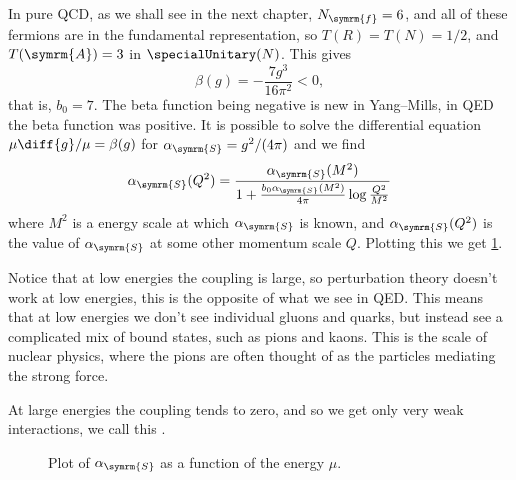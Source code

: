 \documentclass[fleqn]{NotesClass}
\newcommand{\strongCoupling}{\alpha_{\symrm{S}}}
\newcommand{\adjointRep}{\symrm{A}}
\newcommand{\numberFermions}{N_{\symrm{f}}}
\begin{document}
    In pure QCD, as we shall see in the next chapter, \(\numberFermions = 6\), and all of these fermions are in the fundamental representation, so \(T(R) = T(N) = 1/2\), and \(T(\adjointRep) = 3\) in \(\specialUnitary(N)\).
    This gives
    \begin{equation}
        \beta(g) = -\frac{7g^3}{16\pi^2} < 0,
    \end{equation}
    that is, \(b_0 = 7\).
    The beta function being negative is new in Yang--Mills, in QED the beta function was positive.
    It is possible to solve the differential equation \(\mu\diff{g}/{\mu} = \beta(g)\) for \(\strongCoupling = g^2/(4\pi)\) and we find
    \begin{equation}
        \strongCoupling(Q^2) = \frac{\strongCoupling(M^2)}{1 + \frac{b_0\strongCoupling(M^2)}{4\pi}\log\frac{Q^2}{M^2}}
    \end{equation}
    where \(M^2\) is a energy scale at which \(\strongCoupling\) is known, and \(\strongCoupling(Q^2)\) is the value of \(\strongCoupling\) at some other momentum scale \(Q\).
    Plotting this we get \cref{fig:YM beta plot}.
    
    Notice that at low energies the coupling is large, so perturbation theory doesn't work at low energies, this is the opposite of what we see in QED.
    This means that at low energies we don't see individual gluons and quarks, but instead see a complicated mix of bound states, such as pions and kaons.
    This is the scale of nuclear physics, where the pions are often thought of as the particles mediating the strong force.
    
    At large energies the coupling tends to zero, and so we get only very weak interactions, we call this .
    
    \begin{figure}
        \caption{Plot of \(\strongCoupling\) as a function of the energy \(\mu\).}
        \label{fig:YM beta plot}
    \end{figure}
    
\end{document}

